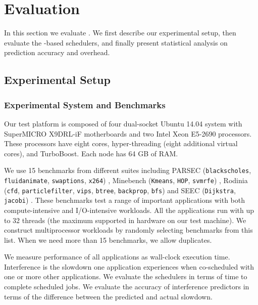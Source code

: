 
\section{Evaluation}
In this section we evaluate \SYSTEM{}. We first describe our
experimental setup, then evaluate the \SYSTEM{}-based schedulers, and
finally present statistical analysis on \SYSTEM{} prediction accuracy
and overhead.

\subsection{Experimental Setup}
\label{sec:setup}

\subsubsection{Experimental System and Benchmarks}
Our test platform is composed of four dual-socket Ubuntu 14.04 system
with SuperMICRO X9DRL-iF motherboards and two Intel Xeon E5-2690
processors.  These processors have eight cores, hyper-threading (eight
additional virtual cores), and TurboBoost.  Each node has 64 GB of
RAM.

We use 15 benchmarks from different suites including PARSEC
(\texttt{blackscholes}, \texttt{fluidanimate}, \texttt{swaptions},
\texttt{x264}) \cite{parsec}, Minebench (\texttt{Kmeans},
\texttt{HOP}, \texttt{svmrfe}) \cite{minebench}, Rodinia
(\texttt{cfd}, \texttt{particlefilter}, \texttt{vips}, \texttt{btree},
\texttt{backprop}, \texttt{bfs}) \cite{rodinia} and SEEC
(\texttt{Dijkstra}, \texttt{jacobi}) \cite{hoffmann2011seec}. These
benchmarks test a range of important applications with both
compute-intensive and I/O-intensive workloads.  All the applications
run with up to 32 threads (the maximum supported in hardware on our
test machine).  We construct multiprocessor workloads by randomly
selecting benchmarks from this list.  When we need more than 15
benchmarks, we allow duplicates.

We measure performance of all applications as wall-clock execution
time.  Interference is the slowdown one application experiences when
co-scheduled with one or more other applications.  We evaluate the
schedulers in terms of time to complete scheduled jobs.  We evaluate
the accuracy of interference predictors in terms of the difference
between the predicted and actual slowdown.

